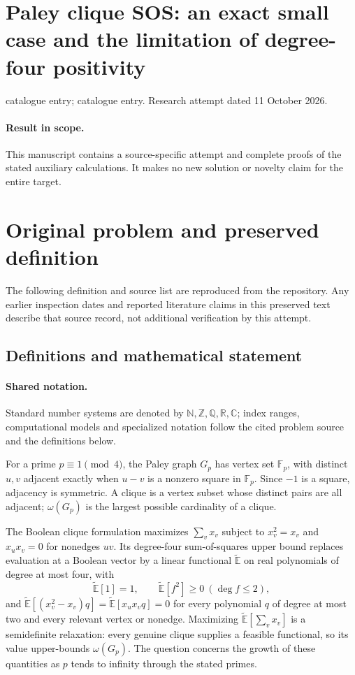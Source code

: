 \documentclass[11pt]{article}
\begin{document}
\section*{Paley clique SOS: an exact small case and the limitation of degree-four positivity}
\noindent catalogue entry; catalogue entry. Research attempt dated 11 October 2026.
\paragraph{Result in scope.}This manuscript contains a source-specific attempt and complete proofs of the stated auxiliary calculations. It makes no new solution or novelty claim for the entire target.
\section{Original problem and preserved definition}
The following definition and source list are reproduced from the repository. Any earlier inspection dates and reported literature claims in this preserved text describe that source record, not additional verification by this attempt.
\subsection{Definitions and mathematical statement}

\paragraph{Shared notation.}Standard number systems are denoted by $\mathbb N,\mathbb Z,\mathbb Q,\mathbb R,\mathbb C$; index ranges, computational models and specialized notation follow the cited problem source and the definitions below.


For a prime $p\equiv1\pmod4$, the Paley graph $G_p$ has vertex set $\mathbb{F}_p$, with distinct $u,v$ adjacent exactly when $u-v$ is a nonzero square in $\mathbb{F}_p$. Since $-1$ is a square, adjacency is symmetric. A clique is a vertex subset whose distinct pairs are all adjacent; $\omega(G_p)$ is the largest possible cardinality of a clique.

The Boolean clique formulation maximizes $\sum_v x_v$ subject to $x_v^2=x_v$ and $x_ux_v=0$ for nonedges $uv$. Its degree-four sum-of-squares upper bound replaces evaluation at a Boolean vector by a linear functional $\widetilde{\mathbb{E}}$ on real polynomials of degree at most four, with
\[
 \widetilde{\mathbb{E}}[1]=1,\qquad
 \widetilde{\mathbb{E}}[f^2]\ge0\ (\deg f\le2),
\]
and $\widetilde{\mathbb{E}}[(x_v^2-x_v)q]=\widetilde{\mathbb{E}}[x_ux_vq]=0$ for every polynomial $q$ of degree at most two and every relevant vertex or nonedge. Maximizing $\widetilde{\mathbb{E}}[\sum_vx_v]$ is a semidefinite relaxation: every genuine clique supplies a feasible functional, so its value upper-bounds $\omega(G_p)$. The question concerns the growth of these quantities as $p$ tends to infinity through the stated primes.
\end{document}
